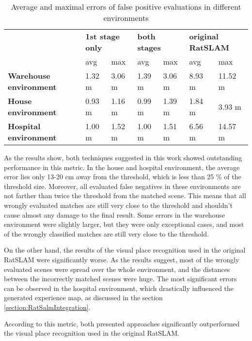\begin{table}[htpb]
    \caption{Average and maximal errors of false positive evaluations in different environments}\label{tab:averageFPError}
    \centering
    \begin{tabular}{l | l  l| l l| l l}
        \toprule
        \textbf{}                      & \multicolumn{2}{l|}{\textbf{1st stage only}} & \multicolumn{2}{l|}{\textbf{both stages}} & \multicolumn{2}{l}{\textbf{original RatSLAM}}                             \\
        {}                             & avg                                          & max                                       & avg                                           & max    & avg    & max     \\
        \hline
        \textbf{Warehouse environment} & 1.32 m                                       & 3.06 m                                    & 1.39 m                                        & 3.06 m & 8.93 m & 11.52 m \\
        \textbf{House environment}     & 0.93 m                                       & 1.16 m                                    & 0.99 m                                        & 1.39 m & 1.84 m & 3.93 m  \\
        \textbf{Hospital environment}  & 1.00 m                                       & 1.52 m                                    & 1.00 m                                        & 1.51 m & 6.56 m & 14.57 m \\
        \bottomrule
    \end{tabular}
\end{table}

As the results show, both techniques suggested in this work showed outstanding performance in this metric. In the house and hospital environment, the average error lies only 13-20 cm away from the threshold, which is less than 25 \% of the threshold size. Moreover, all evaluated false negatives in these environments are not farther than twice the threshold from the matched scene. This means that all wrongly evaluated matches are still very close to the threshold and shouldn't cause almost any damage to the final result. Some errors in the warehouse environment were slightly larger, but they were only exceptional cases, and most of the wrongly classified matches are still very close to the threshold.\par
On the other hand, the results of the visual place recognition used in the original RatSLAM were significantly worse. As the results suggest, most of the wrongly evaluated scenes were spread over the whole environment, and the distances between the incorrectly matched scenes were huge. The most significant errors can be observed in the hospital environment, which drastically influenced the generated experience map, as discussed in the section \ref{section:RatSalmIntegration}.\par
According to this metric, both presented approaches significantly outperformed the visual place recognition used in the original RatSLAM.
